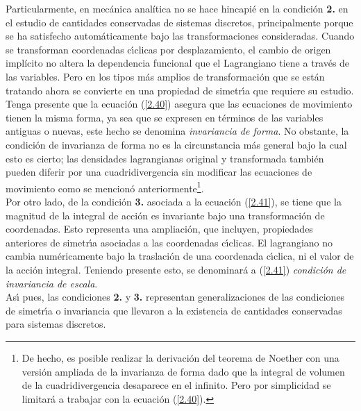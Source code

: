 \vspace{0.5cm}
\noindent
Particularmente, en mecánica analítica no se hace hincapié en la condición \textbf{2.} en el estudio de cantidades conservadas de sistemas discretos, principalmente porque se ha satisfecho autom\'{a}ticamente bajo las transformaciones consideradas. Cuando se transforman coordenadas c\'{\i}clicas por desplazamiento, el cambio de origen implícito no altera la dependencia funcional que el Lagrangiano tiene a trav\'{e}s de las variables. Pero en los tipos m\'{a}s amplios de transformaci\'{o}n que se est\'{a}n tratando ahora se convierte en una propiedad de simetr\'{\i}a que requiere su estudio.\\

\noindent
Tenga presente que la ecuaci\'{o}n (\ref{2.40}) asegura que las ecuaciones de movimiento tienen la misma forma, ya sea que se expresen en t\'{e}rminos de las variables antiguas o nuevas, este hecho se denomina \emph{invariancia
de forma}. No obstante, la condici\'{o}n de invarianza de forma no es la circunstancia m\'{a}s general bajo la cual esto es cierto; las densidades lagrangianas original y transformada tambi\'{e}n pueden diferir por una cuadridivergencia sin modificar las ecuaciones de movimiento como se mencionó anteriormente\footnote{De hecho, es posible realizar la derivaci\'{o}n del teorema de Noether con una versi\'{o}n ampliada de la invarianza de forma dado que la integral de volumen de la cuadridivergencia desaparece en el infinito. Pero por simplicidad se limitar\'{a} a trabajar con la ecuaci\'{o}n (\ref{2.40}).}.\\

\noindent
Por otro lado, de la condici\'{o}n \textbf{3.} asociada a la ecuaci\'{o}n (\ref{2.41}), se tiene que la magnitud de la integral de acci\'{o}n es invariante bajo una transformación de coordenadas. Esto representa una ampliaci\'{o}n, que incluyen, propiedades anteriores de simetr\'{\i}a asociadas a las coordenadas c\'{\i}clicas. El lagrangiano no cambia num\'{e}ricamente bajo la traslaci\'{o}n de una coordenada c\'{\i}clica, ni el valor de la acci\'{o}n integral. Teniendo presente esto, se denominar\'{a} a (\ref{2.41}) \emph{condici\'{o}n de invariancia de escala}.\\

\noindent
As\'{\i} pues, las condiciones \textbf{2.} y \textbf{3.} representan generalizaciones de las condiciones de simetr\'{\i}a o invariancia que llevaron a la existencia de cantidades conservadas para sistemas discretos.\\

